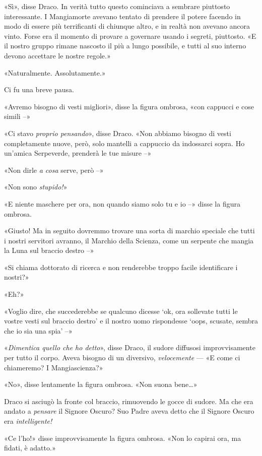 «Sì», disse Draco. In verità tutto questo cominciava a sembrare piuttosto interessante. I Mangiamorte avevano tentato di prendere il potere facendo in modo di essere più terrificanti di chiunque altro, e in realtà non avevano ancora vinto. Forse era il momento di provare a governare usando i segreti, piuttosto. «E il nostro gruppo rimane nascosto il più a lungo possibile, e tutti al suo interno devono accettare le nostre regole.»

«Naturalmente. Assolutamente.»

Ci fu una breve pausa.

«Avremo bisogno di vesti migliori», disse la figura ombrosa, «con cappucci e cose simili –»

«Ci stavo \textit{proprio pensando}», disse Draco. «Non abbiamo bisogno di vesti completamente nuove, però, solo mantelli a cappuccio da indossarci sopra. Ho un’amica Serpeverde, prenderà le tue misure –»

«Non dirle \textit{a cosa} serve, però –»

«Non sono \textit{stupido!}»

«E niente maschere per ora, non quando siamo solo tu e io –» disse la figura ombrosa.

«Giusto! Ma in seguito dovremmo trovare una sorta di marchio speciale che tutti i nostri servitori avranno, il Marchio della Scienza, come un serpente che mangia la Luna sul braccio destro –»

«Si chiama dottorato di ricerca e non renderebbe troppo facile identificare i nostri?»

«Eh?»

«Voglio dire, che succederebbe se qualcuno dicesse ‘ok, ora sollevate tutti le vostre vesti sul braccio destro’ e il nostro uomo rispondesse ‘oops, scusate, sembra che io sia una spia’ –»

«\textit{Dimentica quello che ho detto}», disse Draco, il sudore diffusosi improvvisamente per tutto il corpo. Aveva bisogno di un diversivo, \textit{velocemente} — «E come ci chiameremo? I Mangiascienza?»

«No», disse lentamente la figura ombrosa. «Non suona bene…»

Draco si asciugò la fronte col braccio, rimuovendo le gocce di sudore. Ma che era andato a \textit{pensare} il Signore Oscuro? Suo Padre aveva detto che il Signore Oscuro era \textit{intelligente!}

«Ce l’ho!» disse improvvisamente la figura ombrosa. «Non lo capirai ora, ma fidati, è adatto.»

